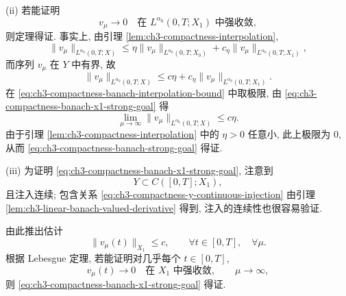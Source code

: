 \begin{Proof}
(ii) 若能证明
\begin{equation}
v_\mu\longrightarrow0
\quad\text{在 }L^{\alpha_0}(0,T;X_1)\text{ 中强收敛},
\label{eq:ch3-compactness-banach-x1-strong-goal}
\end{equation}
则定理得证. 事实上, 由引理 \ref{lem:ch3-compactness-interpolation},
\[
\lVert v_\mu\rVert_{L^{\alpha_0}(0,T;X)}
\leq \eta\lVert v_\mu\rVert_{L^{\alpha_0}(0,T;X_0)}
+c_\eta\lVert v_\mu\rVert_{L^{\alpha_0}(0,T;X_1)},
\]
而序列 $v_\mu$ 在 $Y$ 中有界, 故
\begin{equation}
\lVert v_\mu\rVert_{L^{\alpha_0}(0,T;X)}
\leq c\eta+c_\eta\lVert v_\mu\rVert_{L^{\alpha_0}(0,T;X_1)}.
\label{eq:ch3-compactness-banach-interpolation-bound}
\end{equation}
在 \eqref{eq:ch3-compactness-banach-interpolation-bound} 中取极限, 由 \eqref{eq:ch3-compactness-banach-x1-strong-goal} 得
\begin{equation}
\lim_{\mu\to\infty}\lVert v_\mu\rVert_{L^{\alpha_0}(0,T;X)}\leq c\eta.
\label{eq:ch3-compactness-banach-limsup}
\end{equation}
由于引理 \ref{lem:ch3-compactness-interpolation} 中的 $\eta>0$ 任意小, 此上极限为 $0$, 从而 \eqref{eq:ch3-compactness-banach-strong-goal} 得证.

(iii) 为证明 \eqref{eq:ch3-compactness-banach-x1-strong-goal}, 注意到
\begin{equation}
Y\subset C([0,T];X_1),
\label{eq:ch3-compactness-y-continuous-injection}
\end{equation}
且注入连续; 包含关系 \eqref{eq:ch3-compactness-y-continuous-injection} 由引理 \ref{lem:ch3-linear-banach-valued-derivative} 得到, 注入的连续性也很容易验证.

由此推出估计
\begin{equation}
\lVert v_\mu(t)\rVert_{X_1}\leq c,
\qquad\forall t\in[0,T],\quad\forall\mu.
\label{eq:ch3-compactness-banach-pointwise-bound}
\end{equation}
根据 Lebesgue 定理, 若能证明对几乎每个 $t\in[0,T]$,
\begin{equation}
v_\mu(t)\longrightarrow0\quad\text{在 }X_1\text{ 中强收敛},
\qquad\mu\to\infty,
\label{eq:ch3-compactness-banach-pointwise-convergence}
\end{equation}
则 \eqref{eq:ch3-compactness-banach-x1-strong-goal} 得证.


\end{Proof}
